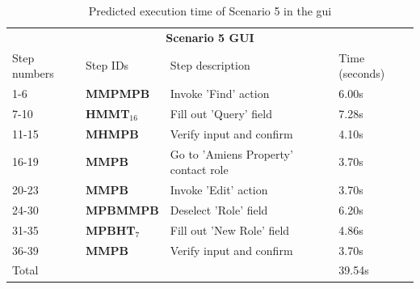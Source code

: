 \begin{table}[H]
	\center
	
	\begin{tabular}{llll}
		\toprule
		\multicolumn{4}{c}{\textbf{Scenario 5 GUI}} \\
		\addlinespace[0.5em]
		Step numbers & Step IDs & Step description & Time (seconds) \\
		\midrule
		1-6 		& \textbf{MMPMPB} 				& Invoke 'Find' action 								& 6.00s \\
		7-10		& \textbf{HMMT$_{16}$} 		& Fill out 'Query' field		 						& 7.28s \\
		11-15	& \textbf{MHMPB}					& Verify input and confirm						& 4.10s \\
		16-19	& \textbf{MMPB}						& Go to 'Amiens Property' contact role	& 3.70s \\
		20-23	& \textbf{MMPB}						& Invoke 'Edit' action								& 3.70s \\
		24-30	& \textbf{MPBMMPB}				& Deselect 'Role' field								& 6.20s \\
		31-35	& \textbf{MPBHT$_7$}			& Fill out 'New Role' field							& 4.86s \\
		36-39	& \textbf{MMPB}						& Verify input and confirm						& 3.70s \\
		\midrule
		\multicolumn{3}{l}{Total}																					& 39.54s\\
		\bottomrule
	\end{tabular}

	\caption{Predicted execution time of Scenario 5 in the \acrshort{gui}}
	\label{table:gomsscenario5gui}
\end{table}

